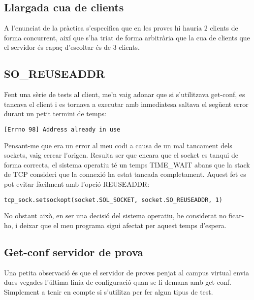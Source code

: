 \documentclass{article}
\begin{document}
\subsection{Llargada cua de clients}
A l'enunciat de la pràctica s'especifica que en les proves hi hauria 2 clients
de forma concurrent, així que s'ha triat de forma arbitrària que la cua 
de clients que el servidor és capaç d'escoltar és de 3 clients.
\subsection{SO\_REUSEADDR}
Fent una sèrie de tests al client, me'n vaig adonar que si s'utilitzava 
get-conf, es tancava el client i es tornava a executar amb inmediatesa 
saltava el següent error durant un petit termini de temps:
\begin{lstlisting}
[Errno 98] Address already in use
\end{lstlisting}

Pensant-me que era un error al meu codi a causa de un mal
tancament dels sockets, vaig cercar l'origen. Resulta ser que encara que
el socket es tanqui de forma correcta, el sistema operatiu té un temps
TIME\_WAIT abans que la stack de TCP consideri que la connexió ha estat
tancada completament. Aquest fet es pot evitar fàcilment amb l'opció
REUSEADDR:
\begin{lstlisting}
tcp_sock.setsockopt(socket.SOL_SOCKET, socket.SO_REUSEADDR, 1)
\end{lstlisting}

No obstant això, en ser una decisió del sistema operatiu, he considerat no
ficar-ho, i deixar que el meu programa sigui afectat per aquest temps
d'espera.

\subsection{Get-conf servidor de prova}
Una petita observació és que el servidor de proves penjat al campus virtual
envia dues vegades l'última línia de configuració quan se li demana amb
get-conf. Simplement a tenir en compte si s'utilitza per fer algun tipus
de test.
\end{document}
